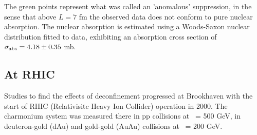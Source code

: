 The green points represent what was called an 'anomalous'
suppression, in the sense that above $L = 7$ fm the observed data does not
conform to pure nuclear absorption. The  nuclear absorption is
estimated using a Woods-Saxon nuclear distribution fitted to data,
exhibiting an absorption cross section of $\sigma_{\rm {abs}}= 4.18 \pm
0.35$ mb.%




\subsection{At RHIC}

Studies to find the effects of deconfinement progressed at Brookhaven
with the start of RHIC (Relativisitc Heavy Ion Collider) operation
in 2000.
The charmonium system was measured there in pp collisions at \s\ = 500
GeV, in deuteron-gold (dAu) and gold-gold (AuAu) collisions at \snn\ =
200 GeV.

